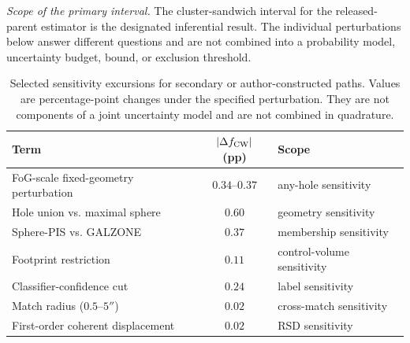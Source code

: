 \documentclass[aps,prd,twocolumn,superscriptaddress,showpacs,preprintnumbers,nofootinbib,longbibliography,floatfix]{revtex4-2}
\begin{document}
\emph{Scope of the primary interval.} The cluster-sandwich interval for
the released-parent estimator is the designated inferential result.
The individual perturbations below answer different questions and are
not combined into a probability model, uncertainty budget, bound, or
exclusion threshold.

\begin{table}[ht]
\caption{Selected sensitivity excursions for secondary or
author-constructed paths. Values are percentage-point changes under the
specified perturbation. They are not components of a joint uncertainty
model and are not combined in quadrature.}
\label{tab:systematic_budget}
\begin{ruledtabular}
\begin{tabular}{lcl}
Term & $|\Delta f_{\rm CW}|$ (pp) & Scope \\
\hline
FoG-scale fixed-geometry perturbation & $0.34$--$0.37$ & any-hole sensitivity \\
Hole union vs. maximal sphere & $0.60$ & geometry sensitivity \\
Sphere-PIS vs. GALZONE & $0.37$ & membership sensitivity \\
Footprint restriction & $0.11$ & control-volume sensitivity \\
Classifier-confidence cut & $0.24$ & label sensitivity \\
Match radius ($0.5$--$5''$) & $0.02$ & cross-match sensitivity \\
First-order coherent displacement & $0.02$ & RSD sensitivity \\
\end{tabular}
\end{ruledtabular}
\end{table}
\end{document}

